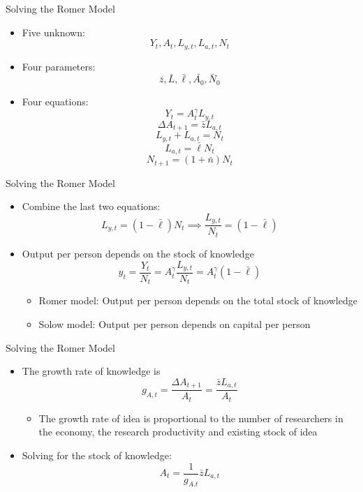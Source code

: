 \documentclass[aspectratio=1610]{beamer}
\begin{document}
\begin{frame}[wide]{Solving the Romer Model}
	\begin{itemize}
		\item Five unknown:
		\[Y_t, A_t, L_{y,t}, L_{a,t}, N_t\]
		\item Four parameters:
		\[\bar{z}, \bar{L}, \bar{\ell}, \bar{A_0}, \bar{N}_0\]
		\item Four equations:
		\[Y_t = A_t^\gamma L_{y,t}\]
		\[\Delta A_{t+1} = \bar{z} L_{a,t}\]
		\[L_{y,t} + L_{a,t} = N_t\]
		\[L_{a,t} = \bar{\ell} N_t\]
		\[N_{t+1} = (1+\bar{n}) N_t\]
	\end{itemize}
\end{frame}

\begin{frame}[wide]{Solving the Romer Model}
	\begin{itemize}
		\item Combine the last two equations:
		\[L_{y,t} = (1-\bar{\ell}) N_t \implies \frac{L_{y,t}}{N_t} = (1-\bar{\ell}) \]
		\item Output per person depends on the stock of knowledge
		\[y_t = \frac{Y_t}{N_t} = A_t^\gamma \frac{L_{y,t}}{N_t} = A_t^\gamma (1-\bar{\ell})\]
		\begin{itemize}
			\item Romer model: 	Output per person depends on the total stock of knowledge
			\item Solow model:	Output per person depends on capital per person
		\end{itemize}
	\end{itemize}
\end{frame}

\begin{frame}[wide]{Solving the Romer Model}
	\begin{itemize}
		\item The growth rate of knowledge is
		\[g_{A,t} = \frac{ \Delta A_{t+1}}{A_t} = \frac{\bar{z}  L_{a,t}}{A_t}\]
		\begin{itemize}
			\item The growth rate of idea is proportional to the number of researchers in the economy, the research productivity and existing stock of idea
		\end{itemize}
		\item Solving for the stock of knowledge:
		\[A_t = \frac{1}{g_{A.t}} \bar{z} L_{a,t} \]
	\end{itemize}
\end{frame}
\end{document}
